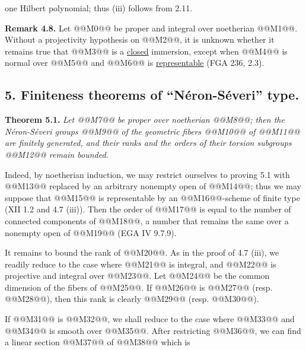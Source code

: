 one Hilbert polynomial; thus (iii) follows from 2.11.

\textbf{Remark 4.8.} Let @@M0@@ be proper and integral over noetherian @@M1@@. Without a projectivity hypothesis on @@M2@@, it is unknown whether it remains true that @@M3@@ is a \uline{closed} immersion, except when @@M4@@ is normal over @@M5@@ and @@M6@@ is \uline{representable} (FGA 236, 2.3).

\providecommand{\NS}{\operatorname{NS}}
\providecommand{\Picard}{\operatorname{Pic}}
\providecommand{\Et}{\mathrm{et}}
\providecommand{\rk}{\operatorname{rk}}
\providecommand{\im}{\operatorname{Im}}
\providecommand{\HH}{\mathrm H}


\subsection*{5. Finiteness theorems of ``N\'eron-S\'everi'' type.}

\textbf{Theorem 5.1.} \emph{Let @@M7@@ be proper over noetherian @@M8@@; then the N\'eron-S\'everi groups @@M9@@ of the geometric fibers @@M10@@ of @@M11@@ are finitely generated, and their ranks and the orders of their torsion subgroups @@M12@@ remain bounded.}

Indeed, by noetherian induction, we may restrict ourselves to proving 5.1 with @@M13@@ replaced by an arbitrary nonempty open of @@M14@@; thus we may suppose that @@M15@@ is representable by an @@M16@@-scheme of finite type (XII 1.2 and 4.7 (iii)). Then the order of @@M17@@ is equal to the number of connected components of @@M18@@, a number that remains the same over a nonempty open of @@M19@@ (EGA IV 9.7.9).

It remains to bound the rank of @@M20@@. As in the proof of 4.7 (iii), we readily reduce to the case where @@M21@@ is integral, and @@M22@@ is projective and integral over @@M23@@. Let @@M24@@ be the common dimension of the fibers of @@M25@@. If @@M26@@ is @@M27@@ (resp. @@M28@@), then this rank is clearly @@M29@@ (resp. @@M30@@).

If @@M31@@ is @@M32@@, we shall reduce to the case where @@M33@@ and @@M34@@ is smooth over @@M35@@. After restricting @@M36@@, we can find a linear section @@M37@@ of @@M38@@ which is

